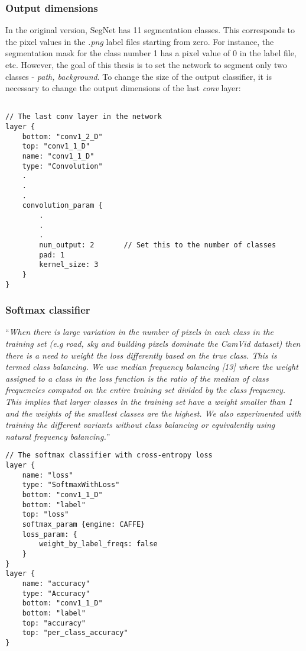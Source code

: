\subsubsection{Output dimensions}

In the original version, SegNet has 11 segmentation classes. This corresponds to the pixel values in the \textit{.png} label files starting from zero. For instance, the segmentation mask for the class number 1 has a pixel value of 0 in the label file, etc. However, the goal of this thesis is to set the network to segment only two classes - \textit{path, background}. To change the size of the output classifier, it is necessary to change the output dimensions of the last \textit{conv} layer:

\begin{lstlisting}[caption={Setting number of outputs in \textit{train.prototxt} \cite{filip_github}},captionpos=b]

// The last conv layer in the network
layer {
	bottom: "conv1_2_D"
	top: "conv1_1_D"
	name: "conv1_1_D"
	type: "Convolution"
	.
	.
	.
	convolution_param {
		.
		.
		.
		num_output: 2		// Set this to the number of classes
		pad: 1
		kernel_size: 3
	}
}
\end{lstlisting}

\newpage
\subsubsection{Softmax classifier}

\enquote{\textit{When there is large variation in the number of
	pixels in each class in the training set (e.g road, sky and building
	pixels dominate the CamVid dataset) then there is a need to weight
	the loss differently based on the true class. This is termed class
	balancing. We use median frequency balancing [13] where the
	weight assigned to a class in the loss function is the ratio of the
	median of class frequencies computed on the entire training set
	divided by the class frequency. This implies that larger classes in
	the training set have a weight smaller than 1 and the weights
	of the smallest classes are the highest. We also experimented
	with training the different variants without class balancing or
	equivalently using natural frequency balancing.}} \cite{segnet}

\begin{lstlisting}[caption={Output layers of \textit{train.prototxt} \cite{filip_github}},captionpos=b]
// The softmax classifier with cross-entropy loss
layer {
	name: "loss"
	type: "SoftmaxWithLoss"
	bottom: "conv1_1_D"
	bottom: "label"
	top: "loss"
	softmax_param {engine: CAFFE}
	loss_param: {
		weight_by_label_freqs: false	     
	}
}
layer {
	name: "accuracy"
	type: "Accuracy"
	bottom: "conv1_1_D"
	bottom: "label"
	top: "accuracy"
	top: "per_class_accuracy"
}
\end{lstlisting}

